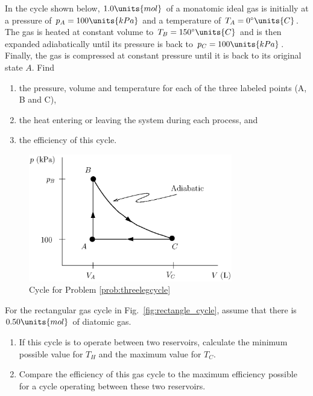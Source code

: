 \begin{problem}  %
  In the cycle shown below, $1.0\units{mol}$  of a
  monatomic ideal gas is initially at a pressure of $p_A=100\units{kPa}$
  and a temperature of $T_A=0^\circ\units{C}$.  The gas is heated at
  constant volume to $T_B = 150^\circ\units{C}$ and is then expanded
  adiabatically until its pressure is back to $p_C=100\units{kPa}$.
  Finally, the gas is compressed at constant pressure until it is back
  to its original state $A$.  Find
  \begin{enumerate}
  \item the pressure, volume and temperature for each of the three
  labeled points (A, B and C),
  \item the heat entering or leaving the system during each process, and
  \item the efficiency of this cycle.
  \end{enumerate}
  \begin{figure}[h]
    \begin{center}
      \includegraphics[width=3.5in]{heat_engines/cycle.eps}
    \end{center}
    \caption{Cycle for Problem \ref{prob:threelegcycle}} 
  \end{figure}
\label{prob:threelegcycle}
\end{problem}

\begin{problem} 
  For the rectangular gas cycle in Fig.~\ref{fig:rectangle_cycle},
  assume that there is $0.50\units{mol}$ of diatomic gas.
  \begin{enumerate}
  \item If this cycle is to operate between two reservoirs, calculate
    the minimum possible value for $T_H$ and the maximum value for
    $T_C$.
  \item Compare the efficiency of this gas cycle to the maximum
    efficiency possible for a cycle operating between these two
    reservoirs.
  \end{enumerate}
\label{prob:rectangularcycle}
\end{problem}

